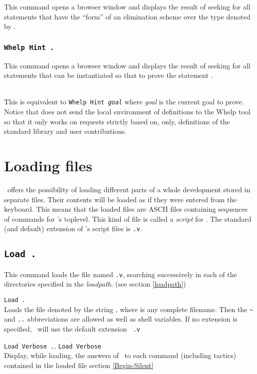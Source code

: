 This command opens a browser window and displays the result of seeking
for all statements that have the ``form'' of an elimination scheme
over the type denoted by {\qualid}.

\subsubsection[\tt Whelp Hint {\term}.]{\tt Whelp Hint {\term}.}

This command opens a browser window and displays the result of seeking
for all statements that can be instantiated so that to prove the
statement {\term}.

\\ This is equivalent to {\tt Whelp Hint
{\sl goal}} where {\sl goal} is the current goal to prove. Notice that
{\Coq} does not send the local environment of definitions to the {\sc
Whelp} tool so that it only works on requests strictly based on, only,
definitions of the standard library and user contributions.

\section{Loading files}

\Coq\ offers the possibility of loading different
parts of a whole development stored in separate files. Their contents
will be loaded as if they were entered from the keyboard. This means
that the loaded files are ASCII files containing sequences of commands
for \Coq's toplevel. This kind of file is called a {\em script} for
\Coq{}. The standard (and default) extension of
\Coq's script files is {\tt .v}.

\subsection[\tt Load {\ident}.]{\tt Load {\ident}.\label{Load}}
This command loads the file named {\ident}{\tt .v}, searching
successively in each of the directories specified in the {\em
  loadpath}. (see section \ref{loadpath})

\begin{Variants}
\item {\tt Load {\str}.}\label{Load-str}\\
  Loads the file denoted by the string {\str}, where {\str} is any
  complete filename. Then the \verb.~. and {\tt ..}
  abbreviations are allowed as well as shell variables. If no
  extension is specified, \Coq\ will use the default extension {\tt
    .v}
\item {\tt Load Verbose {\ident}.}, 
  {\tt Load Verbose {\str}}\\
  Display, while loading, the answers of \Coq\ to each command
  (including tactics) contained in the loaded file
  \SeeAlso section \ref{Begin-Silent}
\end{Variants}

